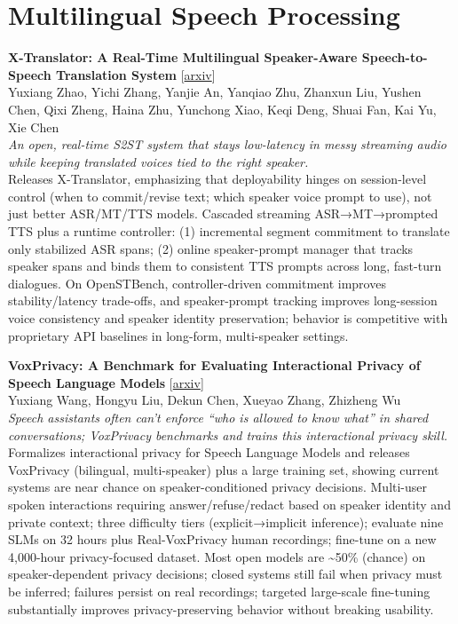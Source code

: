 \documentclass[12pt,letterpaper]{article}
\begin{document}
\medskip


\section*{Multilingual Speech Processing}

{\small\textbf{X-Translator: A Real-Time Multilingual Speaker-Aware Speech-to-Speech Translation System}} {\scriptsize[\href{https://arxiv.org/abs/2607.17544}{arxiv}]}\\
{\scriptsize Yuxiang Zhao, Yichi Zhang, Yanjie An, Yanqiao Zhu, Zhanxun Liu, Yushen Chen, Qixi Zheng, Haina Zhu, Yunchong Xiao, Keqi Deng, Shuai Fan, Kai Yu, Xie Chen}\\

{\small\textit{An open, real-time S2ST system that stays low-latency in messy streaming audio while keeping translated voices tied to the right speaker.}}\\[1pt]
{\footnotesize Releases X-Translator, emphasizing that deployability hinges on session-level control (when to commit/revise text; which speaker voice prompt to use), not just better ASR/MT/TTS models. Cascaded streaming ASR→MT→prompted TTS plus a runtime controller: (1) incremental segment commitment to translate only stabilized ASR spans; (2) online speaker-prompt manager that tracks speaker spans and binds them to consistent TTS prompts across long, fast-turn dialogues. On OpenSTBench, controller-driven commitment improves stability/latency trade-offs, and speaker-prompt tracking improves long-session voice consistency and speaker identity preservation; behavior is competitive with proprietary API baselines in long-form, multi-speaker settings.}

\medskip

{\small\textbf{VoxPrivacy: A Benchmark for Evaluating Interactional Privacy of Speech Language Models}} {\scriptsize[\href{https://arxiv.org/abs/2601.19956}{arxiv}]}\\
{\scriptsize Yuxiang Wang, Hongyu Liu, Dekun Chen, Xueyao Zhang, Zhizheng Wu}\\

{\small\textit{Speech assistants often can't enforce ``who is allowed to know what'' in shared conversations; VoxPrivacy benchmarks and trains this interactional privacy skill.}}\\[1pt]
{\footnotesize Formalizes interactional privacy for Speech Language Models and releases VoxPrivacy (bilingual, multi-speaker) plus a large training set, showing current systems are near chance on speaker-conditioned privacy decisions. Multi-user spoken interactions requiring answer/refuse/redact based on speaker identity and private context; three difficulty tiers (explicit→implicit inference); evaluate nine SLMs on 32 hours plus Real-VoxPrivacy human recordings; fine-tune on a new 4,000-hour privacy-focused dataset. Most open models are \textasciitilde{}50\% (chance) on speaker-dependent privacy decisions; closed systems still fail when privacy must be inferred; failures persist on real recordings; targeted large-scale fine-tuning substantially improves privacy-preserving behavior without breaking usability.}
\end{document}
